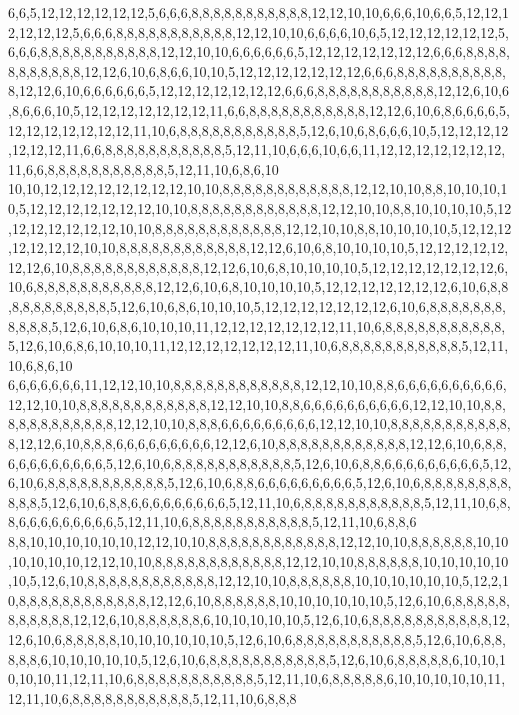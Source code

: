 6,6,5,12,12,12,12,12,12,5,6,6,6,8,8,8,8,8,8,8,8,8,8,8,12,12,10,10,6,6,6,10,6,6,5,12,12,12,12,12,12,5,6,6,6,8,8,8,8,8,8,8,8,8,8,8,12,12,10,10,6,6,6,6,10,6,5,12,12,12,12,12,12,5,6,6,6,8,8,8,8,8,8,8,8,8,8,8,12,12,10,10,6,6,6,6,6,6,5,12,12,12,12,12,12,12,6,6,6,8,8,8,8,8,8,8,8,8,8,8,12,12,6,10,6,8,6,6,10,10,5,12,12,12,12,12,12,12,6,6,6,8,8,8,8,8,8,8,8,8,8,8,12,12,6,10,6,6,6,6,6,6,5,12,12,12,12,12,12,12,6,6,6,8,8,8,8,8,8,8,8,8,8,8,12,12,6,10,6,8,6,6,6,10,5,12,12,12,12,12,12,12,11,6,6,8,8,8,8,8,8,8,8,8,8,8,12,12,6,10,6,8,6,6,6,6,5,12,12,12,12,12,12,12,11,10,6,8,8,8,8,8,8,8,8,8,8,8,5,12,6,10,6,8,6,6,6,10,5,12,12,12,12,12,12,12,11,6,6,8,8,8,8,8,8,8,8,8,8,8,5,12,11,10,6,6,6,10,6,6,11,12,12,12,12,12,12,12,11,6,6,8,8,8,8,8,8,8,8,8,8,8,5,12,11,10,6,8,6,10
10,10,12,12,12,12,12,12,12,12,10,10,8,8,8,8,8,8,8,8,8,8,8,8,12,12,10,10,8,8,10,10,10,10,5,12,12,12,12,12,12,12,10,10,8,8,8,8,8,8,8,8,8,8,8,8,12,12,10,10,8,8,10,10,10,10,5,12,12,12,12,12,12,12,10,10,8,8,8,8,8,8,8,8,8,8,8,8,12,12,10,10,8,8,10,10,10,10,5,12,12,12,12,12,12,12,10,10,8,8,8,8,8,8,8,8,8,8,8,8,12,12,6,10,6,8,10,10,10,10,5,12,12,12,12,12,12,12,6,10,8,8,8,8,8,8,8,8,8,8,8,8,12,12,6,10,6,8,10,10,10,10,5,12,12,12,12,12,12,12,6,10,6,8,8,8,8,8,8,8,8,8,8,8,12,12,6,10,6,8,10,10,10,10,5,12,12,12,12,12,12,12,6,10,6,8,8,8,8,8,8,8,8,8,8,8,5,12,6,10,6,8,6,10,10,10,5,12,12,12,12,12,12,12,6,10,6,8,8,8,8,8,8,8,8,8,8,8,5,12,6,10,6,8,6,10,10,10,11,12,12,12,12,12,12,12,11,10,6,8,8,8,8,8,8,8,8,8,8,8,5,12,6,10,6,8,6,10,10,10,11,12,12,12,12,12,12,12,11,10,6,8,8,8,8,8,8,8,8,8,8,8,5,12,11,10,6,8,6,10
6,6,6,6,6,6,6,11,12,12,10,10,8,8,8,8,8,8,8,8,8,8,8,8,12,12,10,10,8,8,6,6,6,6,6,6,6,6,6,6,12,12,10,10,8,8,8,8,8,8,8,8,8,8,8,8,12,12,10,10,8,8,6,6,6,6,6,6,6,6,6,6,12,12,10,10,8,8,8,8,8,8,8,8,8,8,8,8,12,12,10,10,8,8,8,6,6,6,6,6,6,6,6,6,12,12,10,10,8,8,8,8,8,8,8,8,8,8,8,8,12,12,6,10,8,8,8,6,6,6,6,6,6,6,6,6,12,12,6,10,8,8,8,8,8,8,8,8,8,8,8,8,12,12,6,10,6,8,8,6,6,6,6,6,6,6,6,6,5,12,6,10,6,8,8,8,8,8,8,8,8,8,8,8,5,12,6,10,6,8,8,6,6,6,6,6,6,6,6,6,5,12,6,10,6,8,8,8,8,8,8,8,8,8,8,8,5,12,6,10,6,8,8,6,6,6,6,6,6,6,6,6,5,12,6,10,6,8,8,8,8,8,8,8,8,8,8,8,5,12,6,10,6,8,8,6,6,6,6,6,6,6,6,6,5,12,11,10,6,8,8,8,8,8,8,8,8,8,8,8,5,12,11,10,6,8,8,6,6,6,6,6,6,6,6,6,5,12,11,10,6,8,8,8,8,8,8,8,8,8,8,8,5,12,11,10,6,8,8,6
8,8,10,10,10,10,10,10,12,12,10,10,8,8,8,8,8,8,8,8,8,8,8,8,12,12,10,10,8,8,8,8,8,8,10,10,10,10,10,10,12,12,10,10,8,8,8,8,8,8,8,8,8,8,8,8,12,12,10,10,8,8,8,8,8,8,10,10,10,10,10,10,5,12,6,10,8,8,8,8,8,8,8,8,8,8,8,8,12,12,10,10,8,8,8,8,8,8,10,10,10,10,10,10,5,12,2,10,8,8,8,8,8,8,8,8,8,8,8,8,12,12,6,10,8,8,8,8,8,8,10,10,10,10,10,10,5,12,6,10,6,8,8,8,8,8,8,8,8,8,8,8,12,12,6,10,8,8,8,8,8,8,6,10,10,10,10,10,5,12,6,10,6,8,8,8,8,8,8,8,8,8,8,8,12,12,6,10,6,8,8,8,8,8,10,10,10,10,10,10,5,12,6,10,6,8,8,8,8,8,8,8,8,8,8,8,5,12,6,10,6,8,8,8,8,8,6,10,10,10,10,10,5,12,6,10,6,8,8,8,8,8,8,8,8,8,8,8,5,12,6,10,6,8,8,8,8,8,6,10,10,10,10,10,11,12,11,10,6,8,8,8,8,8,8,8,8,8,8,8,5,12,11,10,6,8,8,8,8,8,6,10,10,10,10,10,11,12,11,10,6,8,8,8,8,8,8,8,8,8,8,8,5,12,11,10,6,8,8,8

